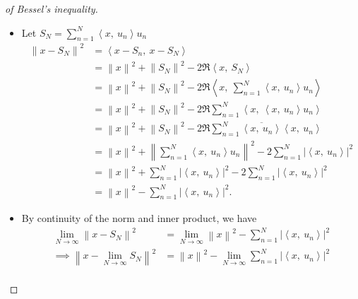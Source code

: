 \begin{proof}[of Bessel's inequality]

\envlist

\begin{itemize}
\item
  Let
  \(S_{N} = \sum_{n=1}^N {\left\langle {x},~{u_{n}} \right\rangle} u_{n}\)
  \begin{align*}
  {\left\lVert {x - S_{N}} \right\rVert}^2 
  &= {\left\langle {x - S_{n}},~{x - S_{N}} \right\rangle} \\
  &= {\left\lVert {x} \right\rVert}^2 + {\left\lVert {S_{N}} \right\rVert}^2 - 2\Re{\left\langle {x},~{S_{N}} \right\rangle} \\
  &= {\left\lVert {x} \right\rVert}^2 + {\left\lVert {S_{N}} \right\rVert}^2 - 2\Re {\left\langle {x},~{\sum_{n=1}^N {\left\langle {x},~{u_{n}} \right\rangle}u_{n}} \right\rangle} \\
  &= {\left\lVert {x} \right\rVert}^2 + {\left\lVert {S_{N}} \right\rVert}^2 - 2\Re \sum_{n=1}^N {\left\langle {x},~{ {\left\langle {x},~{u_{n}} \right\rangle}u_{n}} \right\rangle} \\
  &= {\left\lVert {x} \right\rVert}^2 + {\left\lVert {S_{N}} \right\rVert}^2 - 2\Re \sum_{n=1}^N \overline{{\left\langle {x},~{u_{n}} \right\rangle}}{\left\langle {x},~{u_{n}} \right\rangle} \\
  &= {\left\lVert {x} \right\rVert}^2 + \left\|\sum_{n=1}^N {\left\langle {x},~{u_{n}} \right\rangle} u_{n}\right\|^2 - 2 \sum_{n=1}^N {\left\lvert {{\left\langle {x},~{u_{n}} \right\rangle}} \right\rvert}^2 \\
  &= {\left\lVert {x} \right\rVert}^2 + \sum_{n=1}^N {\left\lvert {{\left\langle {x},~{u_{n}} \right\rangle}} \right\rvert}^2 - 2 \sum_{n=1}^N {\left\lvert {{\left\langle {x},~{u_{n}} \right\rangle}} \right\rvert}^2 \\
  &= {\left\lVert {x} \right\rVert}^2 - \sum_{n=1}^N {\left\lvert {{\left\langle {x},~{u_{n}} \right\rangle}} \right\rvert}^2
  .\end{align*}
\item
  By continuity of the norm and inner product, we have
  \begin{align*}
  \lim_{N\to\infty} {\left\lVert {x - S_{N}} \right\rVert}^2 
  &= \lim_{N\to\infty} {\left\lVert {x} \right\rVert}^2 - \sum_{n=1}^N {\left\lvert {{\left\langle {x},~{u_{n}} \right\rangle}} \right\rvert}^2 \\
  \implies {\left\lVert {x - \lim_{N\to\infty} S_{N}} \right\rVert}^2 &= {\left\lVert {x} \right\rVert}^2 - \lim_{N\to\infty}\sum_{n=1}^N {\left\lvert {{\left\langle {x},~{u_{n}} \right\rangle}} \right\rvert}^2\\

\end{align*}
\end{itemize}
\end{proof}
